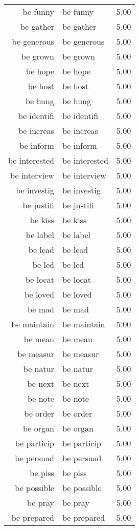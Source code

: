\begin{table}[ht]
\begin{tabular}{rlr}
  be funny & be funny & 5.00 \\ 
  be gather & be gather & 5.00 \\ 
  be generous & be generous & 5.00 \\ 
  be grown & be grown & 5.00 \\ 
  be hope & be hope & 5.00 \\ 
  be host & be host & 5.00 \\ 
  be hung & be hung & 5.00 \\ 
  be identifi & be identifi & 5.00 \\ 
  be increas & be increas & 5.00 \\ 
  be inform & be inform & 5.00 \\ 
  be interested & be interested & 5.00 \\ 
  be interview & be interview & 5.00 \\ 
  be investig & be investig & 5.00 \\ 
  be justifi & be justifi & 5.00 \\ 
  be kiss & be kiss & 5.00 \\ 
  be label & be label & 5.00 \\ 
  be lead & be lead & 5.00 \\ 
  be led & be led & 5.00 \\ 
  be locat & be locat & 5.00 \\ 
  be loved & be loved & 5.00 \\ 
  be mad & be mad & 5.00 \\ 
  be maintain & be maintain & 5.00 \\ 
  be mean & be mean & 5.00 \\ 
  be measur & be measur & 5.00 \\ 
  be natur & be natur & 5.00 \\ 
  be next & be next & 5.00 \\ 
  be note & be note & 5.00 \\ 
  be order & be order & 5.00 \\ 
  be organ & be organ & 5.00 \\ 
  be particip & be particip & 5.00 \\ 
  be persuad & be persuad & 5.00 \\ 
  be piss & be piss & 5.00 \\ 
  be possible & be possible & 5.00 \\ 
  be pray & be pray & 5.00 \\ 
  be prepared & be prepared & 5.00 \\ 

\end{tabular}
\end{table}
